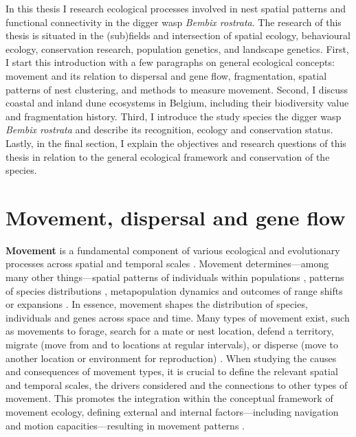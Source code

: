 \documentclass[10pt, twoside]{book} %
\begin{document}
\color{black}

\newpage
\renewcommand\thesection{I.\arabic{section}}
\noindent In this thesis I research ecological processes involved in nest spatial patterns and functional connectivity in the digger wasp \textit{Bembix rostrata}. The research of this thesis is situated in the (sub)fields and intersection of spatial ecology, behavioural ecology, conservation research, population genetics, and landscape genetics. First, I start this introduction with a few paragraphs on general ecological concepts: movement and its relation to dispersal and gene flow, fragmentation, spatial patterns of nest clustering, and methods to measure movement. Second, I discuss coastal and inland dune ecosystems in Belgium, including their biodiversity value and fragmentation history. Third, I introduce the study species the digger wasp \textit{Bembix rostrata} and describe its recognition, ecology and conservation status. Lastly, in the final section, I explain the objectives and research questions of this thesis in relation to the general ecological framework and conservation of the species.

	\section{Movement, dispersal and gene flow}
	\textbf{Movement} is a fundamental component of various ecological and evolutionary processes across spatial and temporal scales \citep{nathan2008}. Movement determines---among many other things---spatial patterns of individuals within populations \citep{lopez2012, liu2013}, patterns of species distributions \citep{bonte2004, kokko2006}, metapopulation dynamics \citep{hanski1994, hanski1998} and outcomes of range shifts or expansions \citep{neubert2000, higgins2003, pagel2012, hodgson2022}. In essence, movement shapes the distribution of species, individuals and genes across space and time. Many types of movement exist, such as movements to forage, search for a mate or nest location, defend a territory, migrate (move from and to locations at regular intervals), or disperse (move to another location or environment for reproduction) \citep{jeltsch2013}. When studying the causes and consequences of movement types, it is crucial to define the relevant spatial and temporal scales, the drivers considered and the connections to other types of movement. This promotes the integration within the conceptual framework of movement ecology, defining external and internal factors---including navigation and motion capacities---resulting in movement patterns \citep{nathan2008a, jeltsch2013, goossens2020}.\\
	
\end{document}
